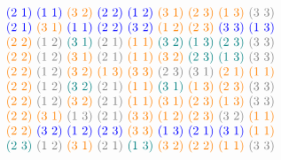 \begin{xmpl}
$$\begin{tabular}{c}
		\textcolor{blue}{(2 1)} \textcolor{blue}{(1 1)} \textcolor{orange}{(3 2)} \textcolor{blue}{(2 2)} \textcolor{blue}{(1 2)} \textcolor{orange}{(3 1)} \textcolor{orange}{(2 3)} \textcolor{orange}{(1 3)} \textcolor{gray}{(3 3)}\\
		\textcolor{blue}{(2 1)} \textcolor{orange}{(3 1)} \textcolor{blue}{(1 1)} \textcolor{blue}{(2 2)} \textcolor{blue}{(3 2)} \textcolor{orange}{(1 2)} \textcolor{orange}{(2 3)} \textcolor{blue}{(3 3)} \textcolor{blue}{(1 3)}\\
		\textcolor{orange}{(2 2)} \textcolor{gray}{(1 2)} \textcolor{teal}{(3 1)} \textcolor{gray}{(2 1)} \textcolor{orange}{(1 1)} \textcolor{teal}{(3 2)} \textcolor{teal}{(1 3)} \textcolor{teal}{(2 3)} \textcolor{gray}{(3 3)}\\
		\textcolor{orange}{(2 2)} \textcolor{gray}{(1 2)} \textcolor{orange}{(3 1)} \textcolor{gray}{(2 1)} \textcolor{orange}{(1 1)} \textcolor{orange}{(3 2)} \textcolor{teal}{(2 3)} \textcolor{teal}{(1 3)} \textcolor{gray}{(3 3)}\\
		\textcolor{orange}{(2 2)} \textcolor{gray}{(1 2)} \textcolor{orange}{(3 2)} \textcolor{orange}{(1 3)} \textcolor{orange}{(3 3)} \textcolor{gray}{(2 3)} \textcolor{gray}{(3 1)} \textcolor{orange}{(2 1)} \textcolor{orange}{(1 1)}\\
		\textcolor{orange}{(2 2)} \textcolor{gray}{(1 2)} \textcolor{teal}{(3 2)} \textcolor{gray}{(2 1)} \textcolor{orange}{(1 1)} \textcolor{teal}{(3 1)} \textcolor{orange}{(1 3)} \textcolor{orange}{(2 3)} \textcolor{gray}{(3 3)}\\
		\textcolor{orange}{(2 2)} \textcolor{gray}{(1 2)} \textcolor{orange}{(3 2)} \textcolor{gray}{(2 1)} \textcolor{orange}{(1 1)} \textcolor{orange}{(3 1)} \textcolor{orange}{(2 3)} \textcolor{orange}{(1 3)} \textcolor{gray}{(3 3)}\\
		\textcolor{orange}{(2 2)} \textcolor{orange}{(3 1)} \textcolor{gray}{(1 3)} \textcolor{gray}{(2 1)} \textcolor{orange}{(3 3)} \textcolor{orange}{(1 2)} \textcolor{orange}{(2 3)} \textcolor{gray}{(3 2)} \textcolor{orange}{(1 1)}\\
		\textcolor{orange}{(2 2)} \textcolor{blue}{(3 2)} \textcolor{blue}{(1 2)} \textcolor{blue}{(2 3)} \textcolor{orange}{(3 3)} \textcolor{blue}{(1 3)} \textcolor{blue}{(2 1)} \textcolor{blue}{(3 1)} \textcolor{orange}{(1 1)}\\
		\textcolor{teal}{(2 3)} \textcolor{gray}{(1 2)} \textcolor{orange}{(3 1)} \textcolor{gray}{(2 1)} \textcolor{teal}{(1 3)} \textcolor{orange}{(3 2)} \textcolor{orange}{(2 2)} \textcolor{orange}{(1 1)} \textcolor{gray}{(3 3)}\\

\end{tabular}$$
\end{xmpl}
